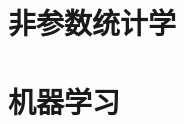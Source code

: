 \documentclass[11pt, a4paper, twoside, openany, UTF8]{ctexbook}
\begin{document}
\part{非参数统计学}
%
%





\part{机器学习}

\appendix


\nocite{*}
\printbibliography[title={参考文献}]

\backmatter

\end{document}
